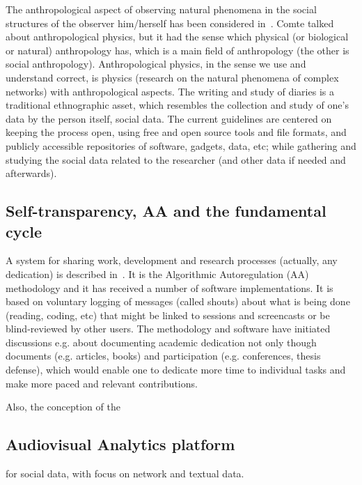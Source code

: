 \documentclass[letterpaper,10pt]{article}
\begin{document}
The anthropological aspect of observing natural
phenomena in the social structures
of the observer him/herself has been
considered in~\cite{an,an2,imp,tese}.
Comte talked about anthropological physics,
but it had the sense which physical (or biological or natural)
anthropology has, which is a main field of anthropology
(the other is social anthropology).
Anthropological physics, in the sense we use and understand correct,
is physics (research on the natural phenomena of complex networks)
with anthropological aspects.
The writing and study of diaries is a traditional ethnographic asset,
which resembles the collection and study of one's data by the person itself,
social data.
The current guidelines are centered on keeping the process open,
using free and open source tools and file formats,
and publicly accessible repositories of software, gadgets, data, etc;
while gathering and studying the social data related to the researcher
(and other data if needed and afterwards).



\subsection{Self-transparency, AA and the fundamental cycle}
A system for sharing work, development and research processes
(actually, any dedication)
is described in~\cite{aa,aa2}.
It is the Algorithmic Autoregulation (AA) methodology and it has
received a number of software implementations.
It is based on voluntary logging of messages (called shouts)
about what is being done (reading, coding, etc) that might
be linked to sessions and screencasts or be blind-reviewed
by other users.
The methodology and software have initiated discussions
e.g. about documenting academic dedication not only though
documents (e.g. articles, books) and participation (e.g. conferences, thesis defense),
which would enable one to dedicate more time to individual
tasks and make more paced and relevant contributions.

Also, the conception of the 


\subsection{Audiovisual Analytics platform}
for social data, with focus on network and textual
		data.                
\end{document}
